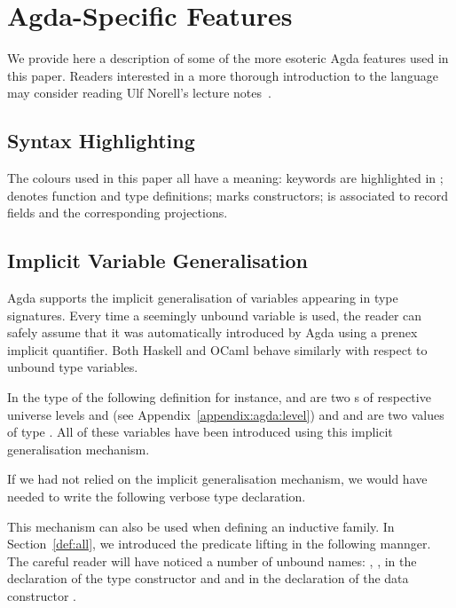 \section{Agda-Specific Features}\label{appendix:agda}

We provide here a description of some of the more esoteric Agda features
used in this paper. Readers interested in a more thorough introduction to
the language may consider reading Ulf Norell's lecture
notes~\cite{DBLP:conf/afp/Norell08}.

\subsection{Syntax Highlighting}

The colours used in this paper all have a meaning: keywords are highlighted
in ;  denotes function and type definitions; 
marks constructors;  is associated to record fields and the
corresponding projections.


\subsection{Implicit Variable Generalisation}\label{appendix:agda:variable}

Agda supports the implicit generalisation of variables appearing in type
signatures. Every time a seemingly unbound variable is used, the reader
can safely assume that it was automatically introduced by Agda using a
prenex implicit quantifier. Both Haskell and OCaml behave similarly with
respect to unbound type variables.

In the type of the following definition for instance,  and  are
two s of respective universe levels  and  (see
Appendix~\ref{appendix:agda:level}) and  and  are two values of
type . All of these variables have been introduced using this implicit
generalisation mechanism.


If we had not relied on the implicit generalisation mechanism, we would have
needed to write the following verbose type declaration.


This mechanism can also be used when defining an inductive family.
In Section~\ref{def:all}, we introduced the predicate lifting 
in the following mannger. The careful reader will have noticed a
number of unbound names: , ,  in the declaration
of the type constructor and  and  in the declaration of
the data constructor \AIC{\_::\_}.

